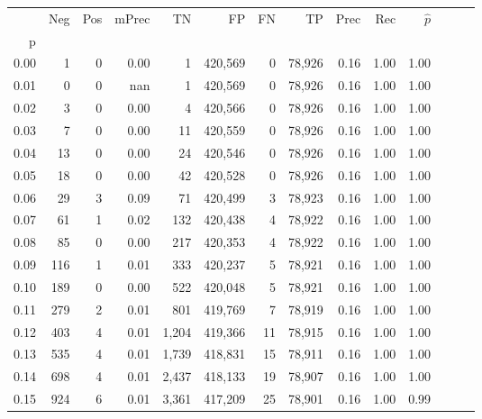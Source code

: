 \begin{tabular}{rrrrrrrrrrrrrr}
\toprule
{} &     Neg &    Pos & mPrec &       TN &       FP &      FN &      TP &  Prec &   Rec & $\hat{p}$ \\
p    &         &        &       &          &          &         &         &       &       &           \\
\midrule
0.00 &       1 &      0 &  0.00 &        1 &  420,569 &       0 &  78,926 &  0.16 &  1.00 &      1.00 \\
0.01 &       0 &      0 &   nan &        1 &  420,569 &       0 &  78,926 &  0.16 &  1.00 &      1.00 \\
0.02 &       3 &      0 &  0.00 &        4 &  420,566 &       0 &  78,926 &  0.16 &  1.00 &      1.00 \\
0.03 &       7 &      0 &  0.00 &       11 &  420,559 &       0 &  78,926 &  0.16 &  1.00 &      1.00 \\
0.04 &      13 &      0 &  0.00 &       24 &  420,546 &       0 &  78,926 &  0.16 &  1.00 &      1.00 \\
0.05 &      18 &      0 &  0.00 &       42 &  420,528 &       0 &  78,926 &  0.16 &  1.00 &      1.00 \\
0.06 &      29 &      3 &  0.09 &       71 &  420,499 &       3 &  78,923 &  0.16 &  1.00 &      1.00 \\
0.07 &      61 &      1 &  0.02 &      132 &  420,438 &       4 &  78,922 &  0.16 &  1.00 &      1.00 \\
0.08 &      85 &      0 &  0.00 &      217 &  420,353 &       4 &  78,922 &  0.16 &  1.00 &      1.00 \\
0.09 &     116 &      1 &  0.01 &      333 &  420,237 &       5 &  78,921 &  0.16 &  1.00 &      1.00 \\
0.10 &     189 &      0 &  0.00 &      522 &  420,048 &       5 &  78,921 &  0.16 &  1.00 &      1.00 \\
0.11 &     279 &      2 &  0.01 &      801 &  419,769 &       7 &  78,919 &  0.16 &  1.00 &      1.00 \\
0.12 &     403 &      4 &  0.01 &    1,204 &  419,366 &      11 &  78,915 &  0.16 &  1.00 &      1.00 \\
0.13 &     535 &      4 &  0.01 &    1,739 &  418,831 &      15 &  78,911 &  0.16 &  1.00 &      1.00 \\
0.14 &     698 &      4 &  0.01 &    2,437 &  418,133 &      19 &  78,907 &  0.16 &  1.00 &      1.00 \\
0.15 &     924 &      6 &  0.01 &    3,361 &  417,209 &      25 &  78,901 &  0.16 &  1.00 &      0.99 \\

\end{tabular}
